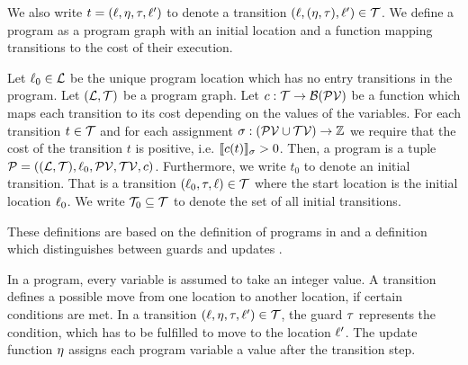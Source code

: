 We also write $t = (\ell, \eta, \tau, \ell')$ to denote a transition $(\ell, (\eta, \tau), \ell') \in \mathcal{T}$.
We define a program as a program graph with an initial location and a function mapping transitions to the cost of their execution.

\begin{definition}[Program] 
  Let $\ell_0 \in \mathcal{L}$ be the unique program location which has no entry transitions in the program.
  Let $(\mathcal{L}, \mathcal{T})$ be a program graph.
  Let $c: \mathcal{T} \rightarrow \mathcal{B}(\mathcal{PV})$ be a function which maps each transition to its cost depending on the values of the variables.
  For each transition $t \in \mathcal{T}$ and for each assignment $\sigma: (\mathcal{PV} \cup \mathcal{TV}) \rightarrow \mathbb{Z}$ we require that the cost of the transition $t$ is positive, i.e. $\llbracket c(t) \rrbracket_{\sigma} > 0$.
  Then, a program is a tuple $\mathcal{P} = ((\mathcal{L}, \mathcal{T}), \ell_0, \mathcal{PV}, \mathcal{TV}, c)$.
  Furthermore, we write $t_0$ to denote an initial transition.
  That is a transition $(\ell_0, \tau, \ell) \in \mathcal{T}$ where the start location is the initial location $\ell_0$.
  We write $\mathcal{T}_0 \subseteq \mathcal{T}$ to denote the set of all initial transitions.
\end{definition}

These definitions are based on the definition of programs in \cite{koat} and a definition which distinguishes between guards and updates \cite{lowerruntime}.

In a program, every variable is assumed to take an integer value.
A transition defines a possible move from one location to another location, if certain conditions are met.
In a transition $(\ell,\eta,\tau,\ell') \in \mathcal{T}$, the guard $\tau$ represents the condition, which has to be fulfilled to move to the location $\ell'$.
The update function $\eta$ assigns each program variable a value after the transition step.

